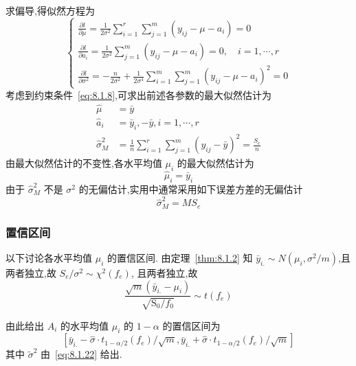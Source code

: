 求偏导,得似然方程为
\begin{equation*}
  \begin{cases}
    \frac{\partial l}{\partial \mu} =\frac{1}{2 \sigma^{2}} \sum_{i=1}^{r} \sum_{j=1}^{m}\left(y_{i j}-\mu-a_{i}\right)=0 \\
    \frac{\partial l}{\partial a_{i}} =\frac{1}{2 \sigma^{2}} \sum_{j=1}^{m}\left(y_{i j}-\mu-a_{i}\right)=0, \quad i=1, \cdots, r\\
    \frac{\partial l}{\partial \sigma^{2}} =-\frac{n}{2 \sigma^{2}}+\frac{1}{2 \sigma^{4}} \sum_{i=1}^{m} \sum_{j=1}^{m}\left(y_{i j}-\mu-a_{i}\right)^{2}=0
  \end{cases}
\end{equation*}
考虑到约束条件~\eqref{eq:8.1.8},可求出前述各参数的最大似然估计为
\begin{equation}
  \label{eq:8.1.20}
  \begin{split}
    \hat{\mu} &= \bar{y}\\
    \hat{a}_{i} & =\bar{y}_{i},-\bar{y}, i=1, \cdots, r \\
    \hat{\sigma}_{M}^{2} &= \frac{1}{n} \sum_{i=1}^{r} \sum_{j=1}^{m}\left(y_{i j}-\bar{y}\right)^{2}=\frac{S_{e}}{n}
  \end{split}
\end{equation}
由最大似然估计的不变性,各水平均值 $\mu_i$ 的最大似然估计为
\begin{equation}
  \label{eq:8.1.21}
  \hat{\mu}_{i}=\bar{y}_{i}
\end{equation}
由于 $\hat{\sigma}_{M}^{2}$ 不是 $\sigma^2$ 的无偏估计,实用中通常采用如下误差方差的无偏估计
\begin{equation}
  \label{eq:8.1.22}
  \hat{\sigma}_{M}^{2} = M S_{e}
\end{equation}

\subsubsection{置信区间}

以下讨论各水平均值 $\mu_i$ 的置信区间. 由定理~\ref{thm:8.1.2} 知 $\bar{y}_{i.} \sim N (\mu_{i}, \sigma^{2}/m)$,且两者独立,故 $S_e/\sigma^2 \sim \chi^2(f_e)$, 且两者独立,故
\begin{equation*}
  \frac{\sqrt{m}\left(\bar{y}_{i.}-\mu_{i}\right)}{\sqrt{\mathrm{S}_{0} / f_{0}}} \sim t\left(f_{e}\right)
\end{equation*}

由此给出 $A_i$ 的水平均值 $\mu_i$ 的 $1-\alpha$ 的置信区间为
\begin{equation}\label{eq:8.1.23}
  \left[\bar{y}_{i.}-\hat{\sigma} \cdot t_{1-\alpha / 2}(f_{e}) / \sqrt{m}, \bar{y}_{i.}+\hat{\sigma} \cdot t_{1-\alpha / 2}(f_{e}) / \sqrt{m}\right]
\end{equation}
其中 $\tilde{\sigma}^2$ 由~\eqref{eq:8.1.22} 给出.

